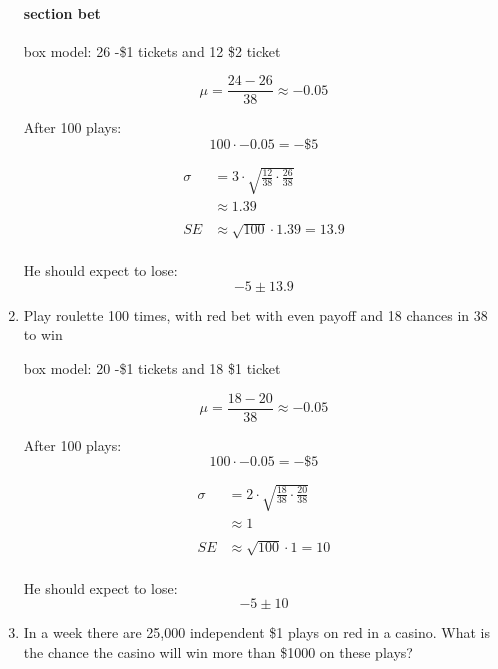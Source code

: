 \documentclass[letterpaper]{exam}
\begin{document}
\begin{enumerate}
      \begin{solution}
        \paragraph{section bet}
        box model: 26 -\$1 tickets and 12 \$2 ticket

        \[
          \mu = \frac{24 - 26}{38} \approx -0.05
        \]

        After 100 plays:
        \[
          100 \cdot -0.05 = -\$5
        \]

        \begin{align*}
          \sigma &= 3 \cdot \sqrt{\frac{12}{38} \cdot \frac{26}{38}} \\
          & \approx 1.39 \\
          \\
          SE &\approx \sqrt{100} \cdot 1.39 = 13.9 \\
        \end{align*}

        He should expect to lose:
        \[
          -5 \pm 13.9
        \]

      \end{solution}
    \item Play roulette 100 times, with red bet with even payoff and 18
      chances in 38 to win

      \begin{solution}
        box model: 20 -\$1 tickets and 18 \$1 ticket

        \[
          \mu = \frac{18 - 20}{38} \approx -0.05
        \]

        After 100 plays:
        \[
          100 \cdot -0.05 = -\$5
        \]

        \begin{align*}
          \sigma & = 2 \cdot \sqrt{\frac{18}{38} \cdot \frac{20}{38}} \\
                 & \approx 1 \\
          \\
          SE     & \approx \sqrt{100} \cdot 1 = 10 \\
        \end{align*}

        He should expect to lose:
        \[
          -5 \pm 10
        \]
      \end{solution}

    \item In a week there are 25,000 independent \$1 plays on red in a casino.
      What is the chance the casino will win more than \$1000 on these plays?


\end{enumerate}
\end{document}

